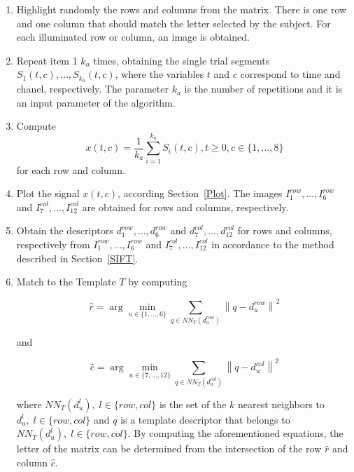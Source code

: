 \documentclass[entropy,article,submit,moreauthors,pdftex,10pt,a4paper]{mdpi}
\begin{document}
\begin{enumerate}
\item Highlight randomly the rows and columns from the matrix.  There is one row and one column that should match the letter selected by the subject. For each illuminated row or column, an image is obtained.
\item Repeat item 1 $k_a$ times, obtaining the single trial segments $S_1(t,c),\dots,S_{k_a}(t,c)$, where the variables $t$ and $c$ correspond to time and chanel, respectively. The parameter $k_a$ is the number of repetitions and it is an input parameter of the algorithm.
\item Compute  
\begin{equation}
x(t,c)= \frac{1}{k_a}\sum_{i=1}^{k_a}S_i(t,c), t\geq 0, c \in \{1,\dots,8\}
\label{averaging}
\end{equation}  
for each row and column. 

\item Plot the signal $x(t,c)$, according Section~\ref{Plot}. The images $I^{row}_1, \dots, I^{row}_6$ and $I^{col}_7,\dots,I^{col}_{12}$ are obtained for rows and columns, respectively. 

\item Obtain the descriptors $ d^{row}_1, \dots,  d^{row}_6 $  and  $ d^{col}_7, \dots,  d^{col}_{12} $ for rows and columns, respectively from $I^{row}_1, \dots, I^{row}_6$ and $I^{col}_7,\dots,I^{col}_{12}$  in accordance to the method described in Section~\ref{SIFT}. 


\item Match to the Template $T$ by computing  



\begin{equation}
\hat{r} = \arg \min_{u \in \{1,\dots,6\}} \sum_{q \in NN_T(d^{row}_u)}^{} \left\lVert q -  d^{row}_u \right\rVert ^2
\label{eq:multiclassificationrow}
\end{equation}

\noindent and

\begin{equation}
\hat{c} = \arg \min_{u \in \{7,\dots,12\}} \sum_{q \in NN_T(d^{col}_u)}^{} \left\lVert q -  d^{col}_u \right\rVert ^2
\label{eq:multiclassificationcol}
\end{equation}

where $NN_T(d^l_u), \;l\in\{row,{col}\}$ is the set of the $k$ nearest neighbors to $d^l_u, \;l\in\{row,{col}\}$ and $q$ is a template descriptor that belongs to $NN_T(d^l_u), \;l\in\{row,{col}\}$.  By computing the aforementioned equations, the letter of the matrix can be determined from the intersection of the row $ \hat{r} $ and column $ \hat{c} $. 


\end{enumerate}
\end{document}

